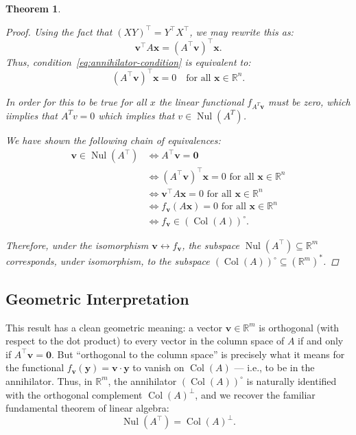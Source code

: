 \documentclass[11pt]{article}
\newcommand{\nul}{\operatorname{Nul}}
\newcommand{\col}{\operatorname{Col}}
\newcommand{\R}{\mathbb{R}}
\newtheorem{theorem}{Theorem}
\begin{document}
\begin{theorem}
\begin{proof}
Using the fact that $(XY)^\top = Y^\top X^\top$, we may rewrite this as:
\[
\mathbf{v}^\top A \mathbf{x} = (A^\top \mathbf{v})^\top \mathbf{x}.
\]
Thus, condition~\eqref{eq:annihilator-condition} is equivalent to:
\[
(A^\top \mathbf{v})^\top \mathbf{x} = 0 \quad \text{for all } \mathbf{x} \in \R^n.
\]

In order for this to be true for all $x$ the linear functional $f_{A^T \mathbf{v}}$ must be zero, which iimplies that $A^T v = 0$ which implies that $v \in \nul(A^T)$.


We have shown the following chain of equivalences:
\begin{align*}
\mathbf{v} \in \nul(A^\top) 
&\iff A^\top \mathbf{v} = \mathbf{0} \\
&\iff (A^\top \mathbf{v})^\top \mathbf{x} = 0 \text{ for all } \mathbf{x} \in \R^n \\
&\iff \mathbf{v}^\top A \mathbf{x} = 0 \text{ for all } \mathbf{x} \in \R^n \\
&\iff f_{\mathbf{v}}(A\mathbf{x}) = 0 \text{ for all } \mathbf{x} \in \R^n \\
&\iff f_{\mathbf{v}} \in (\col(A))^\circ.
\end{align*}

Therefore, under the isomorphism $\mathbf{v} \leftrightarrow f_{\mathbf{v}}$, the subspace $\nul(A^\top) \subseteq \R^m$ corresponds, under isomorphism, to the subspace $(\col(A))^\circ \subseteq (\R^m)^*$.

\end{proof}
\end{theorem}

\subsection*{Geometric Interpretation}

This result has a clean geometric meaning:  
a vector $\mathbf{v} \in \R^m$ is orthogonal (with respect to the dot product) to every vector in the column space of $A$ if and only if $A^\top \mathbf{v} = \mathbf{0}$.  
But ``orthogonal to the column space'' is precisely what it means for the functional $f_{\mathbf{v}}(\mathbf{y}) = \mathbf{v} \cdot \mathbf{y}$ to vanish on $\col(A)$ — i.e., to be in the annihilator.  
Thus, in $\R^m$, the annihilator $(\col(A))^\circ$ is naturally identified with the orthogonal complement $\col(A)^\perp$, and we recover the familiar fundamental theorem of linear algebra:
\[
\nul(A^\top) = \col(A)^\perp.
\]
\end{document}
